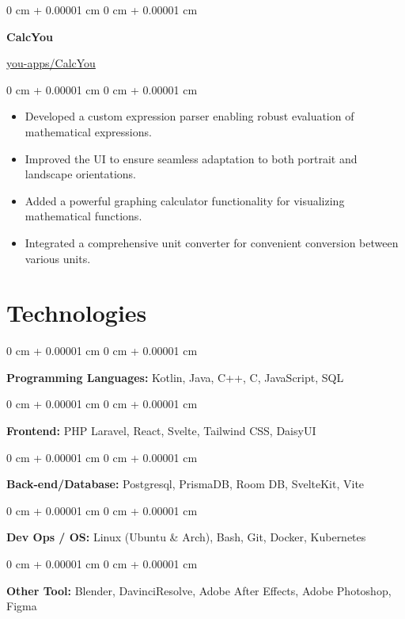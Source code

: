 \documentclass[10pt, letterpaper]{article}
\newenvironment{highlights}{
	\begin{itemize}[
		topsep=0.10 cm,
		parsep=0.10 cm,
		partopsep=0pt,
		itemsep=0pt,
		leftmargin=0 cm + 10pt
		]
	}{
	\end{itemize}
} %
\newenvironment{onecolentry}{
	\begin{adjustwidth}{
			0 cm + 0.00001 cm
		}{
			0 cm + 0.00001 cm
		}
	}{
	\end{adjustwidth}
} %
\newenvironment{twocolentry}[2][]{
	\onecolentry
	\def\secondColumn{#2}
	\setcolumnwidth{\fill, 4.5 cm}
	\begin{paracol}{2}
	}{
		\switchcolumn \raggedleft \secondColumn
	\end{paracol}
	\endonecolentry
} %
\begin{document}
	\vspace{0.2 cm}
	
				\begin{twocolentry}{\href{https://github.com/you-apps/CalcYou}{you-apps/CalcYou}}
		\textbf{CalcYou}
	\end{twocolentry}
	\vspace{0.10 cm}
	\begin{onecolentry}
		\begin{highlights}
			\item Developed a custom expression parser enabling robust evaluation of mathematical expressions.
			\item Improved the UI to ensure seamless adaptation to both portrait and landscape orientations.
			\item Added a powerful graphing calculator functionality for visualizing mathematical functions.
			\item Integrated a comprehensive unit converter for convenient conversion between various units.
		\end{highlights}
	\end{onecolentry}
	
	\vspace{0.2 cm}
	
	\section{Technologies}
	\begin{onecolentry}
		\textbf{Programming Languages:} Kotlin, Java, C++, C, JavaScript, SQL
	\end{onecolentry}
	
	\vspace{0.2 cm}
	
	\begin{onecolentry}
		\textbf{Frontend:} PHP Laravel, React, Svelte, Tailwind CSS, DaisyUI
	\end{onecolentry}
	
	\vspace{0.2 cm}
	
	\begin{onecolentry}
		\textbf{Back-end/Database:} Postgresql, PrismaDB, Room DB, SvelteKit, Vite
	\end{onecolentry}
	
	\vspace{0.2 cm}
	
	\begin{onecolentry}
		\textbf{Dev Ops / OS:} Linux (Ubuntu \& Arch), Bash, Git, Docker, Kubernetes
	\end{onecolentry}
	
	\vspace{0.2 cm}
	
	\begin{onecolentry}
		\textbf{Other Tool:} Blender, DavinciResolve, Adobe After Effects, Adobe Photoshop, Figma
	\end{onecolentry}
	
\end{document}
